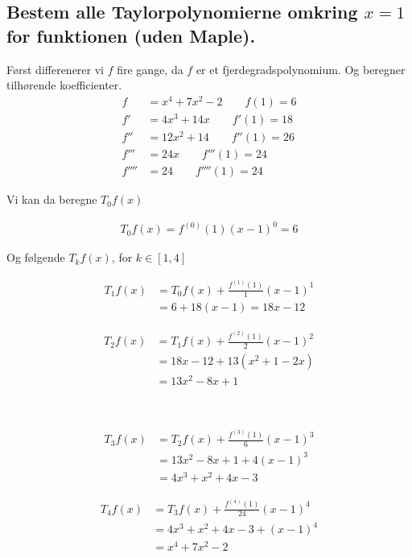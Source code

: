 \documentclass[11pt,a4paper]{article}
\begin{document}
\subsection
{
    \mdseries
    Bestem alle Taylorpolynomierne omkring $x = 1$ for funktionen (uden
    Maple).
}
\begin{multicols}{2}
    Først differenerer vi $f$ fire gange, da $f$ er et fjerdegradspolynomium.
    Og beregner tilhørende koefficienter.
    \begin{align}
        f     &= x^4 + 7x^2 - 2 \qquad f(1) = 6 \\
        f'    &= 4x^3 + 14x \qquad f'(1) = 18 \\
        f''   &= 12x^2 + 14 \qquad f''(1) = 26 \\
        f'''  &= 24x \qquad f'''(1) = 24 \\
        f'''' &= 24 \qquad f''''(1) = 24
    \end{align}

    Vi kan da beregne $T_0 f(x)$

    \begin{align}
        T_0 f(x) = f^{(0)}(1) (x - 1)^0 = 6
    \end{align}

    Og følgende $T_k f(x)$, for $k \in [1,4]$

    \begin{align}
        T_1 f(x) &= T_0 f(x) + \frac{f^{(1)}(1)}{1} (x - 1)^1 \\
                 &= 6 + 18(x - 1) = 18x - 12
    \end{align}

    \begin{align}
        T_2 f(x) &= T_1 f(x) + \frac{f^{(2)}(1)}{2} (x - 1)^2 \\
                 &= 18x - 12 + 13(x^2 + 1 - 2x) \\
                 &= 13x^2 - 8x + 1
    \end{align}

    \vfill{\ }\columnbreak

    \begin{align}
        T_3 f(x) &= T_2 f(x) + \frac{f^{(3)}(1)}{6} (x - 1)^3 \\
                 &= 13x^2 - 8x + 1 + 4(x - 1)^3 \\
                 &= 4x^3 + x^2 + 4x - 3
    \end{align}

    \begin{align}
        T_4 f(x) &= T_3 f(x) + \frac{f^{(4)}(1)}{24} (x - 1)^4 \\
                 &= 4x^3 + x^2 + 4x - 3 + (x - 1)^4 \\
                 &= x^4 + 7x^2 - 2
    \end{align}


\end{multicols}
\end{document}
